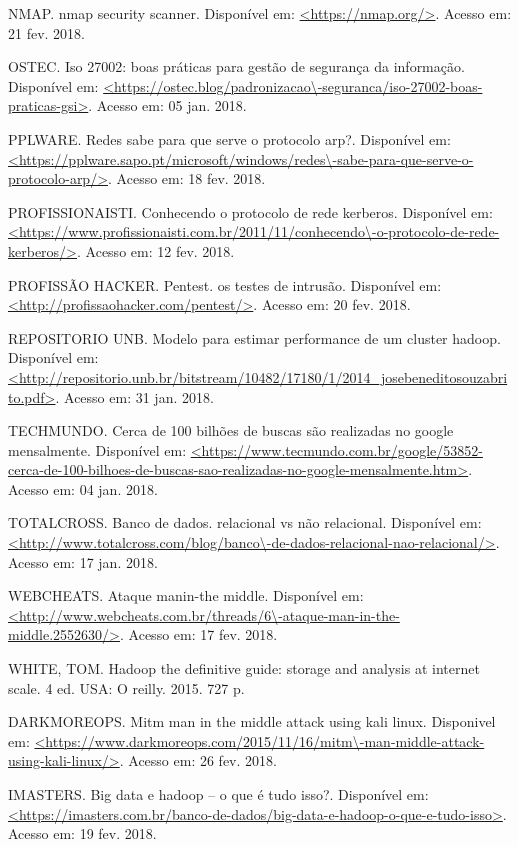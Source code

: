 \begin{thebibliography}{99}
 NMAP. nmap security scanner. Disponível em: \url{<https://nmap.org/>}. Acesso em: 21 fev. 2018.

 OSTEC. Iso 27002: boas práticas para gestão de segurança da informação. Disponível em: \url{<https://ostec.blog/padronizacao\-seguranca/iso-27002-boas-praticas-gsi>}. Acesso em: 05 jan. 2018.

 PPLWARE. Redes sabe para que serve o protocolo arp?. Disponível em: \url{<https://pplware.sapo.pt/microsoft/windows/redes\-sabe-para-que-serve-o-protocolo-arp/>}. Acesso em: 18 fev. 2018.

 PROFISSIONAISTI. Conhecendo o protocolo de rede kerberos. Disponível em: \url{<https://www.profissionaisti.com.br/2011/11/conhecendo\-o-protocolo-de-rede-kerberos/>}. Acesso em: 12 fev. 2018.

 PROFISSÃO HACKER. Pentest. os testes de intrusão. Disponível em: \url{<http://profissaohacker.com/pentest/>}. Acesso em: 20 fev. 2018.

 REPOSITORIO UNB. Modelo para estimar performance de um cluster hadoop. Disponível em: \url{<http://repositorio.unb.br/bitstream/10482/17180/1/2014\_josebeneditosouzabrito.pdf>}. Acesso em: 31 jan. 2018.

 TECHMUNDO. Cerca de 100 bilhões de buscas são realizadas no google mensalmente. Disponível em: \url{<https://www.tecmundo.com.br/google/53852-cerca-de-100-bilhoes-de-buscas-sao-realizadas-no-google-mensalmente.htm>}. Acesso em: 04 jan. 2018.

 TOTALCROSS. Banco de dados. relacional vs não relacional. Disponível em: \url{<http://www.totalcross.com/blog/banco\-de-dados-relacional-nao-relacional/>}. Acesso em: 17 jan. 2018.

 WEBCHEATS. Ataque man\-in-the middle. Disponível em: \url{<http://www.webcheats.com.br/threads/6\-ataque-man-in-the-middle.2552630/>}. Acesso em: 17 fev. 2018.

 WHITE, TOM. Hadoop the definitive guide: storage and analysis at internet scale. 4 ed.  USA: O reilly. 2015. 727 p.

 DARKMOREOPS. Mitm man in the middle attack using kali linux. Disponivel em: \url{<https://www.darkmoreops.com/2015/11/16/mitm\-man-middle-attack-using-kali-linux/>}. Acesso em: 26 fev. 2018.

 IMASTERS. Big data e hadoop – o que é tudo isso?. Disponível em: \url{<https://imasters.com.br/banco-de-dados/big-data-e-hadoop-o-que-e-tudo-isso>}. Acesso em: 19 fev. 2018.


\end{thebibliography}
